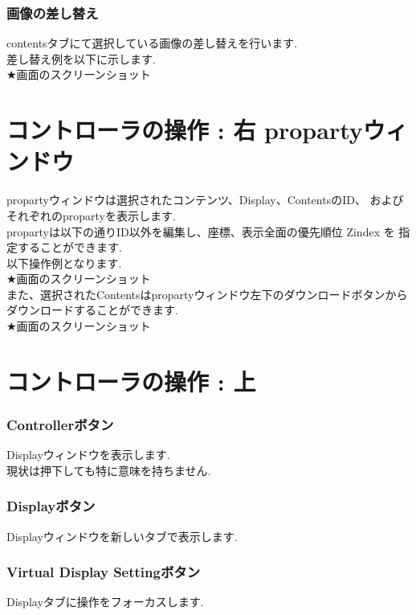 \documentclass[a4paper,10pt,oneside]{jsbook}
\begin{document}
\subsection{画像の差し替え}
contentsタブにて選択している画像の差し替えを行います.\\
差し替え例を以下に示します.\\
★画面のスクリーンショット\\


\chapter{コントローラの操作 : 右 propartyウィンドウ }

propartyウィンドウは選択されたコンテンツ、Display、ContentsのID、
およびそれぞれのpropartyを表示します.\\

propartyは以下の通りID以外を編集し、座標、表示全面の優先順位 Zindex を
指定することができます.\\
以下操作例となります.\\

★画面のスクリーンショット\\


また、選択されたContentsはpropartyウィンドウ左下のダウンロードボタンから
ダウンロードすることができます.\\

★画面のスクリーンショット\\


\chapter{コントローラの操作 : 上}
\subsection{Controllerボタン}
Displayウィンドウを表示します.\\
現状は押下しても特に意味を持ちません.\\

\subsection{Displayボタン}
Displayウィンドウを新しいタブで表示します.\\


\subsection{Virtual Display Settingボタン}
Displayタブに操作をフォーカスします.\\
\end{document}
